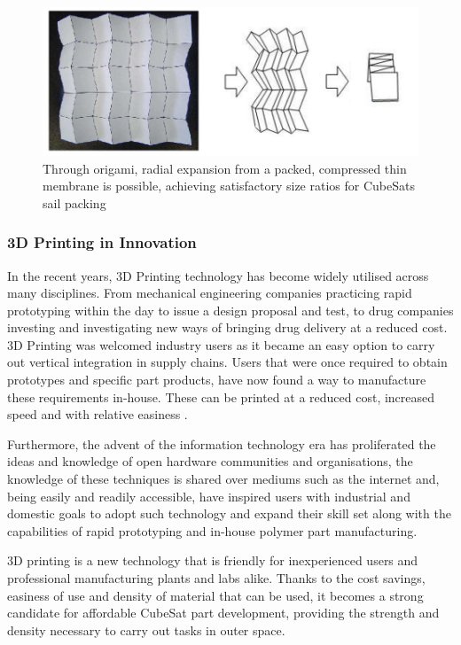 \begin{center}
\begin{figure}[!htb]
    \centering
\includegraphics[width=0.9\linewidth]{origami2} 

\caption{Through origami, radial expansion from a packed, compressed thin membrane is possible, achieving satisfactory size ratios for CubeSats sail packing \protect\cite{Yutaka} }
  \normalsize
  \label{fig:origami}
\end{figure}
\end{center}



\subsubsection{3D Printing in Innovation}

In the recent years, 3D Printing technology has become widely utilised across many disciplines. From mechanical engineering companies practicing rapid prototyping within the day to issue a design proposal and test, to drug companies investing and investigating new ways of bringing drug delivery at a reduced cost. 3D Printing was welcomed industry users as it became an easy option to carry out vertical integration in supply chains. Users that were once required to obtain prototypes and specific part products, have now found a way to manufacture these requirements in-house. These can be printed at a reduced cost, increased speed and with relative easiness \cite{future3D}.

Furthermore, the advent of the information technology era has proliferated the ideas and knowledge of open hardware communities and organisations, the knowledge of these techniques is shared over mediums such as the internet and, being easily and readily accessible, have inspired users with industrial and domestic goals to adopt such technology and expand their skill set along with the capabilities of rapid prototyping and in-house polymer part manufacturing.


3D printing is a new technology that is friendly for inexperienced users and professional manufacturing plants and labs alike. Thanks to the cost savings, easiness of use and density of material that can be used, it becomes a strong candidate for affordable CubeSat part development, providing the strength and density necessary to carry out tasks in outer space.



